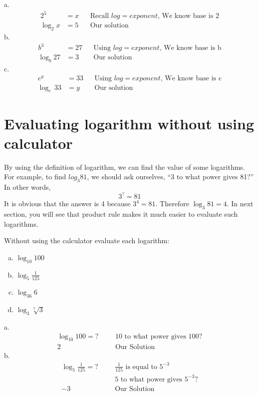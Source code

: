 a.
\begin{align*}
	  2^5 &=x  &&\text{Recall $log=exponent$, We know base is 2}\\
	\log_{2}x &=5	&&\text{Our solution}
\end{align*}
b.
\begin{align*}
	  b^3 &=27  &&\text{Using $log=exponent$, We know base is b}\\
	\log_{b}27 &=3	&&\text{Our solution}
\end{align*}
c.
\begin{align*}
	e^y &=33  &&\text{Using $log=exponent$, We know base is $e$}\\
	\log_{e}\,33 &=y	&&\text{Our solution}
\end{align*}
\section{Evaluating logarithm without using calculator}
By using the definition of logarithm, we can find the value of some logarithms. For 
example, to find $log_{3}81$, we should ask ourselves, “3 to what power gives 81?” In 
other words, \[
				3^?=81
				\]
It is obvious that the answer is 4 because $3^4=81$. Therefore $\log_{3}81=4$. In next 
section, you will see that product rule makes it much easier to evaluate such logarithms.
\begin{exa}
    Without using the calculator evaluate each logarithm:
    \begin{multicols}{2}
	\begin{enumerate}[a.]
		\centering
		\item $\log_{10}100$	
		\item $\log_{5}\frac{1}{125}$
		\item $\log_{36}6$
		\item $\log_{3}\sqrt[7]{3} $
	\end{enumerate}
	\end{multicols}
\end{exa}
%
a. \begin{align*}
	  \log_{10}100 =?&  &   &\text{10 to what power gives 100?}\\
	  2&	&   &\text{Our Solution}
\end{align*}
%
b. \begin{align*}
	  \log_{5}\frac{1}{125}=?&  &       &\text{$\frac{1}{125}$ is equal to $5^{-3}$}\\
	  &&							    &\text{5 to what power gives $5^{-3}$?}\\
	  -3& 	&   &\text{Our Solution}
\end{align*}
